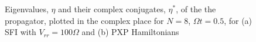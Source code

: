\begin{figure}
  \centering
  \caption{Eigenvalues, $\eta$ and their complex conjugates, $\eta^*$,
    of the the propagator, plotted in the complex place for $N=8$,
    $\Omega t=0.5$, for (a) SFI with $V_{rr}=100\Omega$ and (b) PXP
    Hamiltonians}
\end{figure}

